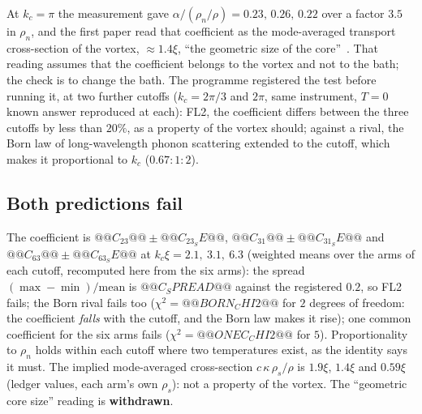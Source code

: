 At $k_c=\pi$ the measurement gave $\alpha/(\rho_n/\rho)=0.23,\,0.26,\,0.22$ over a factor $3.5$ in $\rho_n$, and the first paper read that coefficient as the mode-averaged transport cross-section of the vortex, $\approx1.4\xi$, ``the geometric size of the core''~\cite{Callens2026a}. That reading assumes that the coefficient belongs to the vortex and not to the bath; the check is to change the bath. The programme registered the test before running it, at two further
cutoffs ($k_c=2\pi/3$ and $2\pi$, same instrument, $T=0$ known answer reproduced at each): FL2, the coefficient differs between the three cutoffs by less than $20\%$, as a property of the vortex should; against a rival, the Born law of long-wavelength phonon scattering extended to the cutoff, which makes it proportional to $k_c$ ($0.67:1:2$).

\subsection*{Both predictions fail}

The coefficient is $@@C_23@@\pm@@C_23_SE@@$, $@@C_31@@\pm@@C_31_SE@@$ and $@@C_63@@\pm@@C_63_SE@@$ at $k_c\xi=2.1,\ 3.1,\ 6.3$ (weighted means over the arms of each cutoff, recomputed here from the six arms): the spread $(\max-\min)/\text{mean}$ is $@@C_SPREAD@@$ against the registered $0.2$, so FL2 fails; the Born rival fails too ($\chi^2=@@BORN_CHI2@@$ for $2$ degrees of freedom: the
coefficient \emph{falls} with the cutoff, and the Born law makes it rise); one common coefficient for the six arms fails ($\chi^2=@@ONEC_CHI2@@$ for $5$). Proportionality to $\rho_n$ holds within each cutoff where two temperatures exist, as the identity says it must. The implied mode-averaged cross-section $c\,\kappa\,\rho_s/\rho$ is $1.9\xi$, $1.4\xi$ and $0.59\xi$ (ledger values, each arm's own $\rho_s$): not a property of the vortex.
The ``geometric core size'' reading is \textbf{withdrawn}.

